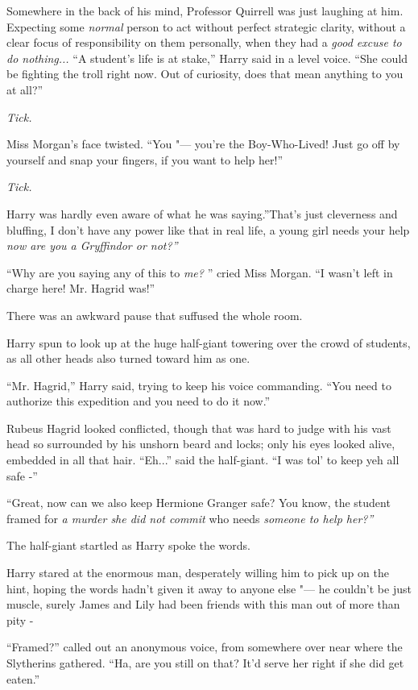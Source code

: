 Somewhere in the back of his mind, Professor Quirrell was just laughing
at him. Expecting some \emph{normal} person to act without perfect
strategic clarity, without a clear focus of responsibility on them
personally, when they had a \emph{good excuse to do nothing...} ``A
student's life is at stake,'' Harry said in a level voice. ``She could
be fighting the troll right now. Out of curiosity, does that mean
anything to you at all?''

\emph{Tick.}

Miss Morgan's face twisted. ``You "--- you're the Boy-Who-Lived! Just go
off by yourself and snap your fingers, if you want to help her!''

\emph{Tick.}

Harry was hardly even aware of what he was saying.''That's just
cleverness and bluffing, I don't have any power like that in real life,
a young girl needs your help \emph{now are you a Gryffindor or not?''}

``Why are you saying any of this to \emph{me?} '' cried Miss Morgan. ``I
wasn't left in charge here! Mr. Hagrid was!''

There was an awkward pause that suffused the whole room.

Harry spun to look up at the huge half-giant towering over the crowd of
students, as all other heads also turned toward him as one.

``Mr. Hagrid,'' Harry said, trying to keep his voice commanding. ``You
need to authorize this expedition and you need to do it now.''

Rubeus Hagrid looked conflicted, though that was hard to judge with his
vast head so surrounded by his unshorn beard and locks; only his eyes
looked alive, embedded in all that hair. ``Eh...'' said the
half-giant. ``I was tol' to keep yeh all safe -''

``Great, now can we also keep Hermione Granger safe? You know, the
student framed for \emph{a murder she did not commit} who needs
\emph{someone to help her?''}

The half-giant startled as Harry spoke the words.

Harry stared at the enormous man, desperately willing him to pick up on
the hint, hoping the words hadn't given it away to anyone else "--- he
couldn't be just muscle, surely James and Lily had been friends with
this man out of more than pity -

``Framed?'' called out an anonymous voice, from somewhere over near
where the Slytherins gathered. ``Ha, are you still on that? It'd serve
her right if she did get eaten.''

